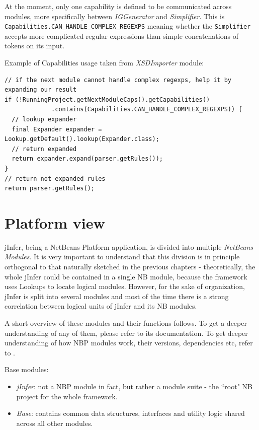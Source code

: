 \documentclass[a4paper,10pt,oneside]{article}
\newcommand{\code}[1]{\texttt{#1}}
\newcommand{\jmodule}[1]{\emph{#1}}
\begin{document}
At the moment, only one capability is defined to be communicated across modules, more specifically between \jmodule{IGGenerator} and \jmodule{Simplifier}. This is \code{Capabilities.CAN\_HANDLE\_COMPLEX\_REGEXPS} meaning whether the \code{Simplifier} accepts more complicated regular expressions than simple concatenations of tokens on its input.

Example of Capabilities usage taken from \jmodule{XSDImporter} module:
\begin{verbatim}
// if the next module cannot handle complex regexps, help it by expanding our result
if (!RunningProject.getNextModuleCaps().getCapabilities()
             .contains(Capabilities.CAN_HANDLE_COMPLEX_REGEXPS)) { 
  // lookup expander
  final Expander expander = Lookup.getDefault().lookup(Expander.class);
  // return expanded
  return expander.expand(parser.getRules());
}
// return not expanded rules
return parser.getRules();
\end{verbatim}

\section{Platform view}
jInfer, being a NetBeans Platform application, is divided into multiple \emph{NetBeans Modules}. It is very important to understand that this division is in principle orthogonal to that naturally sketched in the previous chapters - theoretically, the whole jInfer could be contained in a single NB module, because the framework uses Lookups to locate logical modules. However, for the sake of organization, jInfer is split into several modules and most of the time there is a strong correlation between logical units of jInfer and its NB modules.

A short overview of these modules and their functions follows. To get a deeper understanding of any of them, please refer to its documentation. To get deeper understanding of how NBP modules work, their versions, dependencies etc, refer to \cite{modules_api}.

\noindent Base modules:
\begin{itemize}
	\item \jmodule{jInfer}: not a NBP module in fact, but rather a module suite - the ``root" NB project for the whole framework.
	\item \jmodule{Base}: contains common data structures, interfaces and utility logic shared across all other modules.
\end{itemize}
\end{document}
